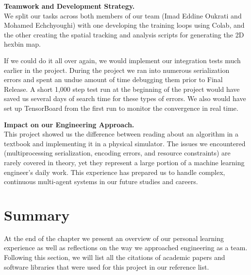 \bigskip
\noindent\textbf{Teamwork and Development Strategy.} \\
We split our tasks across both members of our team (Imad Eddine Oukrati and Mohamed Echchyoughi) with one developing the training loops using Colab, and the other creating the spatial tracking and analysis scripts for generating the 2D hexbin map.

If we could do it all over again, we would implement our integration tests much earlier in the project. During the project we ran into numerous serialization errors and spent an undue amount of time debugging them prior to Final Release. A short 1,000 step test run at the beginning of the project would have saved us several days of search time for these types of errors. We also would have set up TensorBoard from the first run to monitor the convergence in real time.

\bigskip
\noindent\textbf{Impact on our Engineering Approach.} \\
This project showed us the difference between reading about an algorithm in a textbook and implementing it in a physical simulator. The issues we encountered (multiprocessing serialization, encoding errors, and resource constraints) are rarely covered in theory, yet they represent a large portion of a machine learning engineer's daily work. This experience has prepared us to handle complex, continuous multi-agent systems in our future studies and careers.

\section{Summary}
\label{sec:reflection_summary}

At the end of the chapter we present an overview of our personal learning experience as well as reflections on the way we approached engineering as a team. Following this section, we will list all the citations of academic papers and software libraries that were used for this project in our reference list.